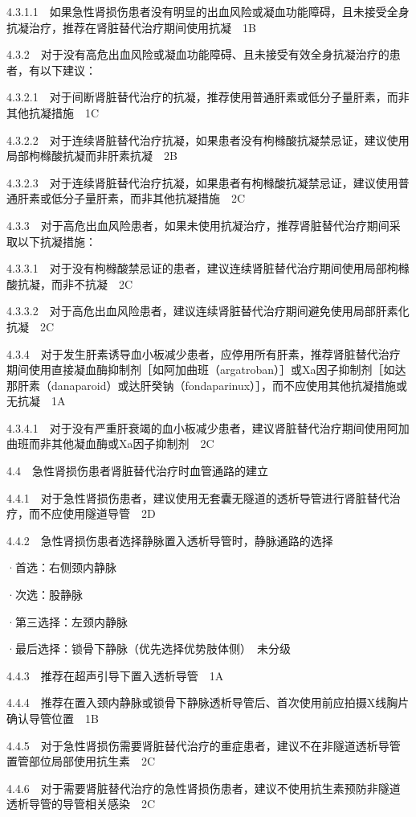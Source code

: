 4.3.1.1　如果急性肾损伤患者没有明显的出血风险或凝血功能障碍，且未接受全身抗凝治疗，推荐在肾脏替代治疗期间使用抗凝　1B

4.3.2　对于没有高危出血风险或凝血功能障碍、且未接受有效全身抗凝治疗的患者，有以下建议：

4.3.2.1　对于间断肾脏替代治疗的抗凝，推荐使用普通肝素或低分子量肝素，而非其他抗凝措施　1C

4.3.2.2　对于连续肾脏替代治疗抗凝，如果患者没有枸橼酸抗凝禁忌证，建议使用局部枸橼酸抗凝而非肝素抗凝　2B

4.3.2.3　对于连续肾脏替代治疗抗凝，如果患者有枸橼酸抗凝禁忌证，建议使用普通肝素或低分子量肝素，而非其他抗凝措施　2C

4.3.3　对于高危出血风险患者，如果未使用抗凝治疗，推荐肾脏替代治疗期间采取以下抗凝措施：

4.3.3.1　对于没有枸橼酸禁忌证的患者，建议连续肾脏替代治疗期间使用局部枸橼酸抗凝，而非不抗凝　2C

4.3.3.2　对于高危出血风险患者，建议连续肾脏替代治疗期间避免使用局部肝素化抗凝　2C

4.3.4　对于发生肝素诱导血小板减少患者，应停用所有肝素，推荐肾脏替代治疗期间使用直接凝血酶抑制剂［如阿加曲班（argatroban）］或Xa因子抑制剂［如达那肝素（danaparoid）或达肝癸钠（fondaparinux）］，而不应使用其他抗凝措施或无抗凝　1A

4.3.4.1　对于没有严重肝衰竭的血小板减少患者，建议肾脏替代治疗期间使用阿加曲班而非其他凝血酶或Xa因子抑制剂　2C

4.4　急性肾损伤患者肾脏替代治疗时血管通路的建立

4.4.1　对于急性肾损伤患者，建议使用无套囊无隧道的透析导管进行肾脏替代治疗，而不应使用隧道导管　2D

4.4.2　急性肾损伤患者选择静脉置入透析导管时，静脉通路的选择

·首选：右侧颈内静脉

·次选：股静脉

·第三选择：左颈内静脉

·最后选择：锁骨下静脉（优先选择优势肢体侧）　未分级

4.4.3　推荐在超声引导下置入透析导管　1A

4.4.4　推荐在置入颈内静脉或锁骨下静脉透析导管后、首次使用前应拍摄X线胸片确认导管位置　1B

4.4.5　对于急性肾损伤需要肾脏替代治疗的重症患者，建议不在非隧道透析导管置管部位局部使用抗生素　2C

4.4.6　对于需要肾脏替代治疗的急性肾损伤患者，建议不使用抗生素预防非隧道透析导管的导管相关感染　2C

